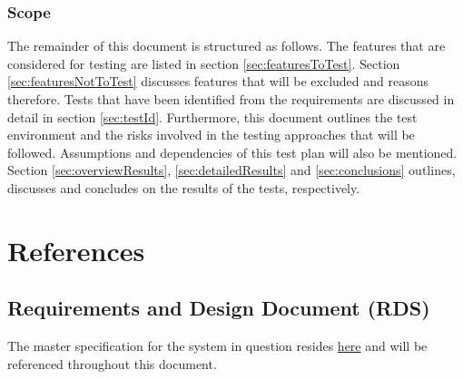 \subsubsection{Scope}
The remainder of this document is structured as follows. The features that are considered for testing are listed in section \ref{sec:featuresToTest}. Section \ref{sec:featuresNotToTest} discusses features that will be excluded and reasons therefore. Tests that have been identified from the requirements are discussed in detail in section \ref{sec:testId}. Furthermore, this document outlines the test environment and the risks involved in the testing approaches that will be followed. Assumptions and dependencies of this test plan will also be mentioned. Section \ref{sec:overviewResults}, \ref{sec:detailedResults} and \ref{sec:conclusions} outlines, discusses and concludes on the results of the tests, respectively.

\section{References} \label{sec:references}
\subsection{Requirements and Design Document (RDS)}
\hypersetup{
	linkcolor = blue       
}   
The master specification for the system in question resides \href{https://clickup.up.ac.za/bbcswebdav/pid-791422-dt-content-rid-8256558_1/xid-8256558_1}{here} and will be referenced throughout this document.
\hypersetup{
	linkcolor = black       
} 